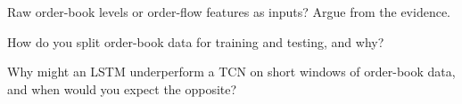 \begin{interviewq}\label{iq:ml:sequence-models-on-order-books:4}
Raw order-book levels or order-flow features as inputs? Argue from the evidence.
\end{interviewq}

\begin{interviewq}\label{iq:ml:sequence-models-on-order-books:5}
How do you split order-book data for training and testing, and why?
\end{interviewq}

\begin{interviewq}\label{iq:ml:sequence-models-on-order-books:6}
Why might an LSTM underperform a TCN on short windows of order-book data, and when would you expect the opposite?
\end{interviewq}
